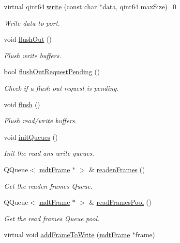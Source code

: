 \begin{DoxyCompactItemize}
virtual qint64 \hyperlink{classmdt_abstract_port_a64d4802975a76474b9196c91f57a6d90}{write} (const char $\ast$data, qint64 max\-Size)=0
\begin{DoxyCompactList}\small\item\em Write data to port. \end{DoxyCompactList}\item 
void \hyperlink{classmdt_abstract_port_ad199c6310801893f1f7de2a2391606fc}{flush\-Out} ()
\begin{DoxyCompactList}\small\item\em Flush write buffers. \end{DoxyCompactList}\item 
bool \hyperlink{classmdt_abstract_port_a2cc79d9288bebafaa183753dcf0807f3}{flush\-Out\-Request\-Pending} ()
\begin{DoxyCompactList}\small\item\em Check if a flush out request is pending. \end{DoxyCompactList}\item 
void \hyperlink{classmdt_abstract_port_abde440c49b95833f821e1333c40a7398}{flush} ()
\begin{DoxyCompactList}\small\item\em Flush read/write buffers. \end{DoxyCompactList}\item 
void \hyperlink{classmdt_abstract_port_adf06d095d6c3e6ce939a3998bcf8b829}{init\-Queues} ()
\begin{DoxyCompactList}\small\item\em Init the read ans write queues. \end{DoxyCompactList}\item 
Q\-Queue$<$ \hyperlink{classmdt_frame}{mdt\-Frame} $\ast$ $>$ \& \hyperlink{classmdt_abstract_port_a05356a33dc546a11d2794a0419d749e0}{readen\-Frames} ()
\begin{DoxyCompactList}\small\item\em Get the readen frames Queue. \end{DoxyCompactList}\item 
Q\-Queue$<$ \hyperlink{classmdt_frame}{mdt\-Frame} $\ast$ $>$ \& \hyperlink{classmdt_abstract_port_a3850ab819a8fc5dad22af14b74c45274}{read\-Frames\-Pool} ()
\begin{DoxyCompactList}\small\item\em Get the read frames Queue pool. \end{DoxyCompactList}\item 
virtual void \hyperlink{classmdt_abstract_port_a9a69eb2fc07d551ab37c011487fa319d}{add\-Frame\-To\-Write} (\hyperlink{classmdt_frame}{mdt\-Frame} $\ast$frame)

\end{DoxyCompactItemize}
